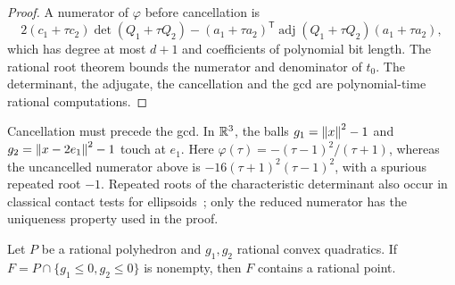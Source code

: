 \begin{proof}
A numerator of $\varphi$ before cancellation is
\[
2(c_1+\tau c_2)\det(Q_1+\tau Q_2)-(a_1+\tau a_2)^{\mathsf T}
\operatorname{adj}(Q_1+\tau Q_2)(a_1+\tau a_2),
\]
which has degree at most $d+1$ and coefficients of polynomial bit length.
The rational root theorem bounds the numerator and denominator of $t_0$. The
determinant, the adjugate, the cancellation and the gcd are polynomial-time
rational computations.
\end{proof}

Cancellation must precede the gcd. In $\mathbb R^3$, the balls
$g_1=\left\lVert x\right\rVert^2-1$ and $g_2=\left\lVert x-2e_1\right\rVert^2-1$ touch at $e_1$. Here
$\varphi(\tau)=-(\tau-1)^2/(\tau+1)$, whereas the uncancelled numerator above
is $-16(\tau+1)^2(\tau-1)^2$, with a spurious repeated root $-1$. Repeated
roots of the characteristic determinant also occur in classical contact tests
for ellipsoids~\cite{JiaChoiMourrainWang2011}; only the reduced numerator has
the uniqueness property used in the proof.

\begin{proposition}
\label{prop:qc-two-rows}
Let $P$ be a rational polyhedron and $g_1,g_2$ rational convex quadratics. If
$F=P\cap\{g_1\le0,g_2\le0\}$ is nonempty, then $F$ contains a rational point.
\end{proposition}


